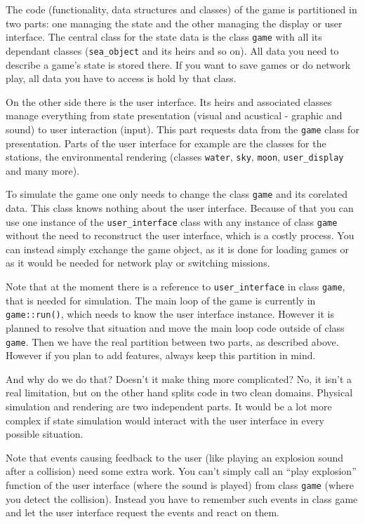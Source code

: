 \documentclass[english,a4paper,12pt]{report}
\begin{document}
The code (functionality, data structures and classes) of the game is
partitioned in two parts: one managing the state and the other managing
the display or user interface. The central class for the state data is
the class \texttt{game} with all its dependant classes
(\texttt{sea\_object} and its heirs and so on). All data you need to
describe a game's state is stored there. If you want to save games or do
network play, all data you have to access is hold by that class.

On the other side there is the user interface. Its heirs and associated
classes manage everything from state presentation (visual and acustical
- graphic and sound) to user interaction (input). This part requests
data from the \texttt{game} class for presentation. Parts of the user
interface for example are the classes for the stations, the
environmental rendering (classes \texttt{water}, \texttt{sky},
\texttt{moon}, \texttt{user\_display} and many more).

To simulate the game one only needs to change the class \texttt{game}
and its corelated data. This class knows nothing about the user
interface. Because of that you can use one instance of the
\texttt{user\_interface} class with any instance of class \texttt{game}
without the need to reconstruct the user interface, which is a costly
process. You can instead simply exchange the game object, as it is done
for loading games or as it would be needed for network play or switching
missions.

Note that at the moment there is a reference to \texttt{user\_interface}
in class \texttt{game}, that is needed for simulation. The main loop of
the game is currently in \texttt{game::run()}, which needs to know the
user interface instance. However it is planned to resolve that situation
and move the main loop code outside of class \texttt{game}. Then we have
the real partition between two parts, as described above. However if you
plan to add features, always keep this partition in mind.

And why do we do that? Doesn't it make thing more complicated? No, it
isn't a real limitation, but on the other hand splits code in two clean
domains. Physical simulation and rendering are two independent parts. It
would be a lot more complex if state simulation would interact with the
user interface in every possible situation.

Note that events causing feedback to the user (like playing an explosion
sound after a collision) need some extra work. You can't simply call an
``play explosion'' function of the user interface (where the sound is
played) from class \texttt{game} (where you detect the collision).
Instead you have to remember such events in class game and let the user
interface request the events and react on them.
\end{document}
